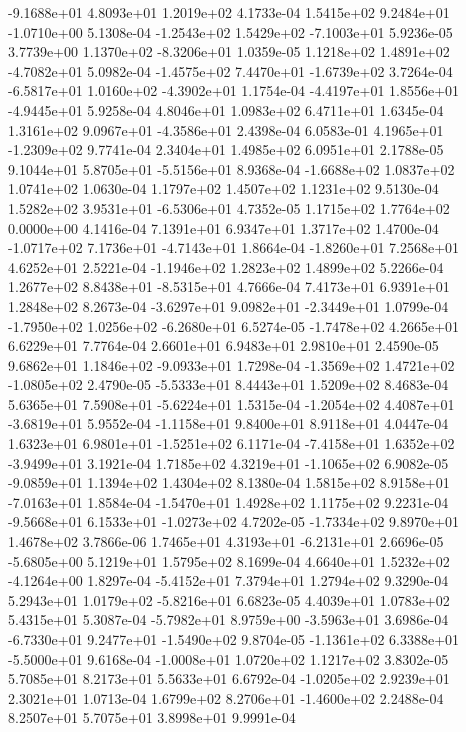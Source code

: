 -9.1688e+01  4.8093e+01  1.2019e+02  4.1733e-04
 1.5415e+02  9.2484e+01 -1.0710e+00  5.1308e-04
-1.2543e+02  1.5429e+02 -7.1003e+01  5.9236e-05
 3.7739e+00  1.1370e+02 -8.3206e+01  1.0359e-05
 1.1218e+02  1.4891e+02 -4.7082e+01  5.0982e-04
-1.4575e+02  7.4470e+01 -1.6739e+02  3.7264e-04
-6.5817e+01  1.0160e+02 -4.3902e+01  1.1754e-04
-4.4197e+01  1.8556e+01 -4.9445e+01  5.9258e-04
4.8046e+01 1.0983e+02 6.4711e+01  1.6345e-04
 1.3161e+02  9.0967e+01 -4.3586e+01  2.4398e-04
 6.0583e-01  4.1965e+01 -1.2309e+02  9.7741e-04
2.3404e+01 1.4985e+02 6.0951e+01  2.1788e-05
 9.1044e+01  5.8705e+01 -5.5156e+01  8.9368e-04
-1.6688e+02  1.0837e+02  1.0741e+02  1.0630e-04
1.1797e+02 1.4507e+02 1.1231e+02  9.5130e-04
 1.5282e+02  3.9531e+01 -6.5306e+01  4.7352e-05
1.1715e+02 1.7764e+02 0.0000e+00  4.1416e-04
7.1391e+01 6.9347e+01 1.3717e+02  1.4700e-04
-1.0717e+02  7.1736e+01 -4.7143e+01  1.8664e-04
-1.8260e+01  7.2568e+01  4.6252e+01  2.5221e-04
-1.1946e+02  1.2823e+02  1.4899e+02  5.2266e-04
 1.2677e+02  8.8438e+01 -8.5315e+01  4.7666e-04
7.4173e+01 6.9391e+01 1.2848e+02  8.2673e-04
-3.6297e+01  9.0982e+01 -2.3449e+01  1.0799e-04
-1.7950e+02  1.0256e+02 -6.2680e+01  6.5274e-05
-1.7478e+02  4.2665e+01  6.6229e+01  7.7764e-04
2.6601e+01 6.9483e+01 2.9810e+01  2.4590e-05
 9.6862e+01  1.1846e+02 -9.0933e+01  1.7298e-04
-1.3569e+02  1.4721e+02 -1.0805e+02  2.4790e-05
-5.5333e+01  8.4443e+01  1.5209e+02  8.4683e-04
 5.6365e+01  7.5908e+01 -5.6224e+01  1.5315e-04
-1.2054e+02  4.4087e+01 -3.6819e+01  5.9552e-04
-1.1158e+01  9.8400e+01  8.9118e+01  4.0447e-04
 1.6323e+01  6.9801e+01 -1.5251e+02  6.1171e-04
-7.4158e+01  1.6352e+02 -3.9499e+01  3.1921e-04
 1.7185e+02  4.3219e+01 -1.1065e+02  6.9082e-05
-9.0859e+01  1.1394e+02  1.4304e+02  8.1380e-04
 1.5815e+02  8.9158e+01 -7.0163e+01  1.8584e-04
-1.5470e+01  1.4928e+02  1.1175e+02  9.2231e-04
-9.5668e+01  6.1533e+01 -1.0273e+02  4.7202e-05
-1.7334e+02  9.8970e+01  1.4678e+02  3.7866e-06
 1.7465e+01  4.3193e+01 -6.2131e+01  2.6696e-05
-5.6805e+00  5.1219e+01  1.5795e+02  8.1699e-04
 4.6640e+01  1.5232e+02 -4.1264e+00  1.8297e-04
-5.4152e+01  7.3794e+01  1.2794e+02  9.3290e-04
 5.2943e+01  1.0179e+02 -5.8216e+01  6.6823e-05
4.4039e+01 1.0783e+02 5.4315e+01  5.3087e-04
-5.7982e+01  8.9759e+00 -3.5963e+01  3.6986e-04
-6.7330e+01  9.2477e+01 -1.5490e+02  9.8704e-05
-1.1361e+02  6.3388e+01 -5.5000e+01  9.6168e-04
-1.0008e+01  1.0720e+02  1.1217e+02  3.8302e-05
5.7085e+01 8.2173e+01 5.5633e+01  6.6792e-04
-1.0205e+02  2.9239e+01  2.3021e+01  1.0713e-04
 1.6799e+02  8.2706e+01 -1.4600e+02  2.2488e-04
8.2507e+01 5.7075e+01 3.8998e+01  9.9991e-04
